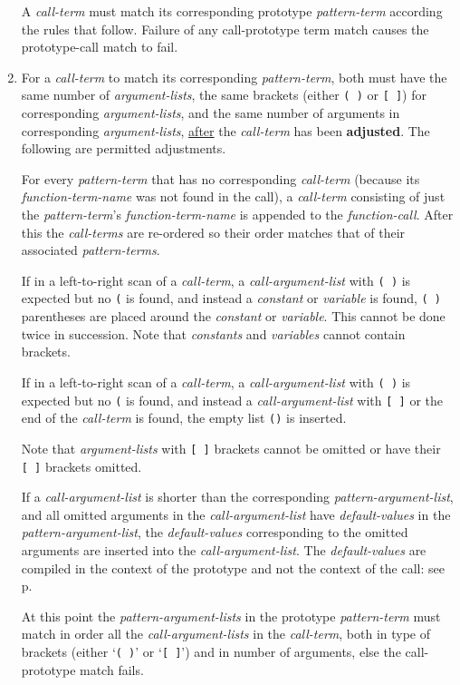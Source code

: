 \documentclass[12pt]{article}
\newcommand{\key}[1]{{\rm \bfseries #1}}
\newcommand{\pagref}[1]{p\pageref{#1}}
\begin{document}
\begin{enumerate}
A {\em call-term}
must match its corresponding prototype {\em pattern-term} according
the rules that follow.  Failure of any call-prototype term match
causes the prototype-call match to fail.

\item\label{CALL-PROTOTYPE-CALL-TERM-ADJUSTMENT}
For a {\em call-term} to match its corresponding {\em pattern-term},
both must have the same number of {\em argument-lists}, the same
brackets (either {\tt (~)} or {\tt [~]}) for corresponding
{\em argument-lists}, and the same number of
arguments in corresponding {\em argument-lists}, \underline{after}
the {\em call-term} has been \key{adjusted}.  The following are
permitted adjustments.

For every {\em pattern-term} that has no corresponding {\em call-term}
(because its {\em function-term-name} was not found in the call),
a {\em call-term} consisting of just the {\em pattern-term}'s
{\em function-term-name} is appended to the {\em function-call}.
After this the {\em call-terms} are re-ordered so their order
matches that of their associated {\em pattern-terms}.

If in a left-to-right scan of a {\em call-term},
a {\em call-argument-list} with {\tt (~)} is expected but no {\tt (}
is found, and instead a {\em constant} or {\em variable}
is found, {\tt (~)} parentheses are placed around the
{\em constant} or {\em variable}.  This cannot be
done twice in succession.  Note that {\em constants} and
{\em variables} cannot contain brackets.

If in a left-to-right scan of a {\em call-term},
a {\em call-argument-list} with {\tt (~)} is expected but no {\tt (}
is found, and instead a {\em call-argument-list} with {\tt [~]}
or the end of the {\em call-term} is found,
the empty list {\tt ()} is inserted.

Note that {\em argument-lists} with {\tt [~]} brackets cannot
be omitted or have their {\tt [~]} brackets omitted.

If a {\em call-argument-list} is shorter than the
corresponding {\em pattern-argument-list}, and all omitted
arguments in the {\em call-argument-list} have {\em default-values}
in the {\em pattern-argument-list}, the {\em default-values} corresponding
to the omitted arguments are inserted into
the {\em call-argument-list}.
The {\em default-values} are compiled in the context of the prototype
and not the context of the call: see \pagref{DEFAULT-CONTEXT}.

At this point the {\em pattern-argument-lists} in the prototype
{\em pattern-term} must match in order all the {\em call-argument-lists}
in the {\em call-term}, both in
type of brackets (either `{\tt (~)}' or `{\tt [~]}') and in number
of arguments, else the call-prototype match fails.


\end{enumerate}
\end{document}
